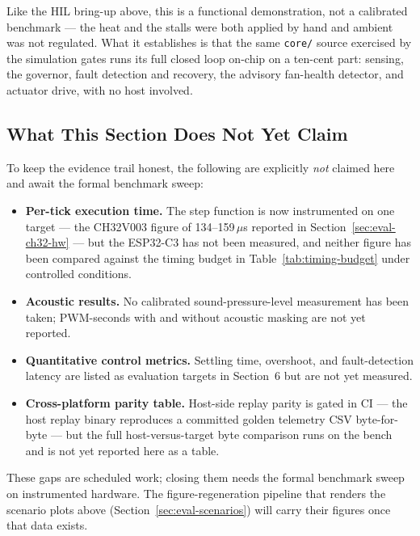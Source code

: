Like the HIL bring-up above, this is a functional demonstration, not a calibrated benchmark --- the heat and the stalls were both applied by hand and ambient was not regulated. What it establishes is that the same \texttt{core/} source exercised by the simulation gates runs its full closed loop on-chip on a ten-cent part: sensing, the governor, fault detection and recovery, the advisory fan-health detector, and actuator drive, with no host involved.

\subsection{What This Section Does Not Yet Claim}\label{sec:eval-gaps}

To keep the evidence trail honest, the following are explicitly \emph{not} claimed here and await the formal benchmark sweep:

\begin{itemize}[leftmargin=*]
    \item \textbf{Per-tick execution time.} The step function is now instrumented on one target --- the CH32V003 figure of 134--159\,$\mu$s reported in Section~\ref{sec:eval-ch32-hw} --- but the ESP32-C3 has not been measured, and neither figure has been compared against the timing budget in Table~\ref{tab:timing-budget} under controlled conditions.
    \item \textbf{Acoustic results.} No calibrated sound-pressure-level measurement has been taken; PWM-seconds with and without acoustic masking are not yet reported.
    \item \textbf{Quantitative control metrics.} Settling time, overshoot, and fault-detection latency are listed as evaluation targets in Section~6 but are not yet measured.
    \item \textbf{Cross-platform parity table.} Host-side replay parity is gated in CI --- the host replay binary reproduces a committed golden telemetry CSV byte-for-byte --- but the full host-versus-target byte comparison runs on the bench and is not yet reported here as a table.
\end{itemize}

These gaps are scheduled work; closing them needs the formal benchmark sweep on instrumented hardware. The figure-regeneration pipeline that renders the scenario plots above (Section~\ref{sec:eval-scenarios}) will carry their figures once that data exists.

\endinput
